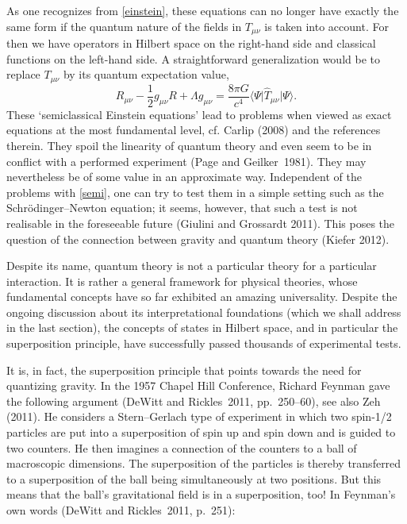 \documentclass[12pt,a4paper]{article}
\newcommand{\be}{\begin{equation}}
\newcommand{\ee}{\end{equation}}
\newcommand{\lb}{\label}
\begin{document}
As one recognizes from \eqref{einstein}, these equations can no longer
have exactly the same form if the quantum nature of the fields in
$T_{\mu\nu}$ is taken into account. For then we have operators in
Hilbert space on the right-hand side and classical functions on the
left-hand side. A straightforward generalization would be to replace
$T_{\mu\nu}$ by its quantum expectation value, 
\be
\lb{semi}
R_{\mu\nu}-\frac{1}{2}g_{\mu\nu}R+\Lambda g_{\mu\nu}=
  \frac{8\pi G}{c^4}\langle\Psi\vert\hat{T}_{\mu\nu}
\vert\Psi\rangle .
\ee
These `semiclassical Einstein equations' lead to problems when viewed
as exact equations at the most fundamental level,
cf. Carlip (2008) and the references therein. They spoil the linearity of
quantum theory and even seem to be in
conflict with a performed experiment (Page and Geilker~1981). They
may nevertheless be of some value in an approximate way. Independent
of the problems with \eqref{semi}, one can try to test them in a
simple setting such as the Schr\"odinger--Newton equation; it seems,
however, that such a test is not realisable in the foreseeable future
(Giulini and Grossardt 2011). 
This poses the question of the
connection between gravity and quantum theory (Kiefer 2012).

Despite its name, quantum theory is not a particular theory for a
particular interaction. It is rather a general framework for physical
theories, whose fundamental concepts have so far exhibited an amazing
universality. Despite the ongoing discussion about its
interpretational foundations (which we shall address in the last
section), the concepts of states in Hilbert space, and in particular
the superposition principle, have successfully passed thousands of
experimental tests.

It is, in fact, the superposition principle that points towards the
need for quantizing gravity. In the 1957 Chapel Hill Conference,
Richard Feynman gave the following argument (DeWitt and Rickles~2011,
pp.~250--60), see also Zeh (2011). He considers a Stern--Gerlach type
of experiment in 
which two spin-1/2 particles are put into a superposition of spin up
and spin down and is guided to two counters. He then imagines a connection of
the counters to a ball of macroscopic dimensions. The superposition of
the particles is thereby transferred to a superposition of the ball
being simultaneously at two positions. But this means that the ball's
gravitational field is in a superposition, too! In Feynman's own words
(DeWitt and Rickles~2011, p.~251):
\end{document}
